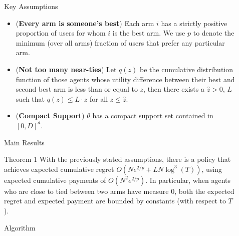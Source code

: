 \documentclass[final]{beamer}
\newlength{\sepwid}
\newlength{\onecolwid}
\begin{document}
\begin{frame}[t]
\begin{columns}[t]
\begin{column}{\onecolwid}
\end{column} %

\begin{column}{\sepwid}\end{column} %
\begin{column}{\onecolwid} %


\begin{block}{Key Assumptions}

\begin{itemize}
\item (\textbf{Every arm is someone's best}) Each arm $i$ has a strictly positive proportion of users for whom $i$ is the best arm. We use $p$ to denote the minimum (over all arms) fraction of users that prefer any particular arm.
\item (\textbf{Not too many near-ties}) Let $q(z)$ be the cumulative distribution function of those agents whose utility difference between their best and second best arm is less than or equal to $z$, then there exists a $\hat{z}>0$, $L$ such that $q(z)\leq L\cdot z$ for all $z\leq \hat{z}$.
\item (\textbf{Compact Support}) $\theta$ has a compact support set contained in $[0,D]^{d}$.
\end{itemize}

\end{block}


\begin{block}{Main Results}
\begin{alertblock}{Theorem 1}
With the previously stated assumptions, there is a policy that achieves expected 
cumulative regret $O (N e^{2/p} + L N \log^3(T))$,
using expected cumulative payments of $O(N^2 e^{2/p})$.
\newline
\newline
In particular, when agents who are close to tied between two arms have measure $0$,
both the expected regret and expected payment are bounded by constants
(with respect to $T$). 
\end{alertblock}
\end{block}

\begin{block}{Algorithm}



\end{block}
\end{column}
\end{columns}
\end{frame}
\end{document}
